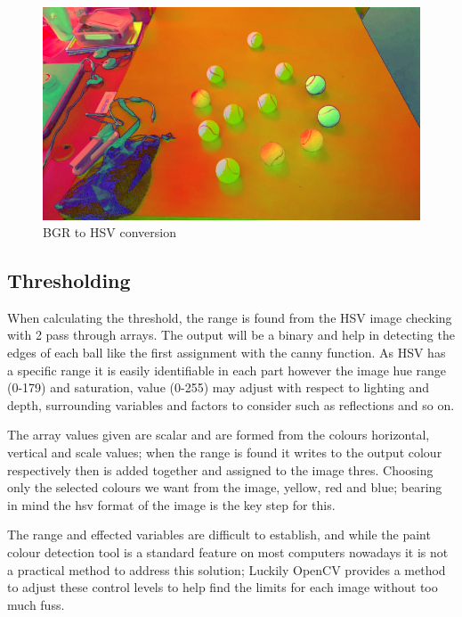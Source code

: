 \documentclass[a4paper, 10pt]{article}
\begin{document}
\begin{figure}[H]
  \includegraphics[width=\linewidth]{images/HSV}
  \caption{BGR to HSV conversion}
  \label{fig:BGR to HSV conversion}
\end{figure}


\subsection{Thresholding}

When calculating the threshold, the range is found from the HSV image checking with 2 pass through arrays. The output will be a binary and help in detecting the edges of each ball like the first assignment with the canny function. As HSV has a specific range it is easily identifiable in each part however the image hue range (0-179) and saturation, value (0-255) may adjust with respect to lighting and depth, surrounding variables and factors to consider such as reflections and so on.

The array values given are scalar and are formed from the colours horizontal, vertical and scale values; when the range is found it writes to the output colour respectively then is added together and assigned to the image thres. Choosing only the selected colours we want from the image, yellow, red and blue; bearing in mind the hsv format of the image is the key step for this. 

The range and effected variables are difficult to establish, and while the paint colour detection tool is a standard feature on most computers nowadays it is not a practical method to address this solution; Luckily OpenCV provides a method to adjust these control levels to help find the limits for each image without too much fuss.
\end{document}
